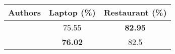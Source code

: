 \begin{tabular}{|c|c|c|}
\hline
Authors & Laptop (\%) & Restaurant (\%)\\
\hline
\cite{zhao2019modeling}   & 75.55 &  \textbf{82.95}\\
\hline
\cite{zeng2019lcf}   & \textbf{76.02} &  82.5\\
\hline
\end{tabular}